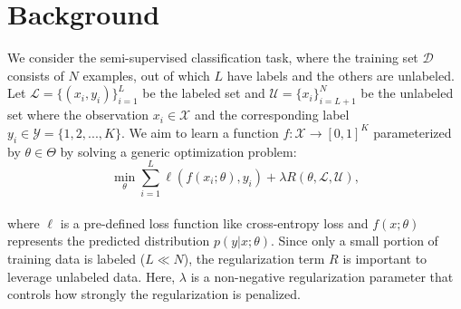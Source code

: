 \documentclass[10pt,twocolumn,letterpaper]{article}
\begin{document}
\section{Background}
\label{sec:problem}
We consider the semi-supervised classification task, where the training set $\mathcal{D}$ consists of $N$ examples, out of which $L$ have labels and the others are unlabeled. Let $\mathcal{L}=\{(x_i, y_i)\}_{i=1}^{L}$ be the labeled set and $\mathcal{U} = \{x_i\}_{i=L+1}^N$ be the unlabeled set where the observation $x_i\in \mathcal{X}$ and the corresponding label $y_i\in \mathcal{Y} = \{1,2,...,K\}$. We aim to learn a function $f:\mathcal{X}\to [0,1]^K$ parameterized by $\theta\in \Theta$ by solving a generic optimization problem:\\[-.3cm] %
\begin{equation}
\label{equ:2}
\min_{\theta}\sum\limits_{i=1}^L \ell(f(x_i;\theta), y_i) + \lambda R(\theta, \mathcal{L},\mathcal{U}),
\end{equation}\\[-.4cm]
where $\ell$ is a pre-defined loss function like cross-entropy loss and $f(x;\theta)$ represents the predicted distribution $p\left( y|x;\theta\right)$.
Since only a small portion of training data is labeled ($L\ll N$), the regularization term $R$ is important to leverage unlabeled data.
Here, $\lambda$ is a non-negative regularization parameter that controls how strongly the regularization is penalized.
\end{document}
